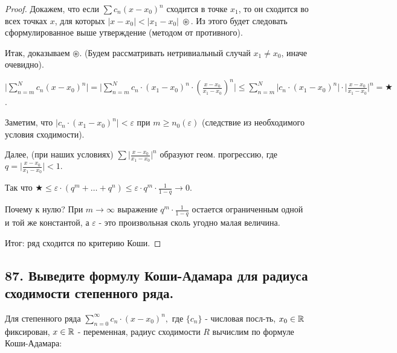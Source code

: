 \documentclass[a4paper, fleqn]{article}
\begin{document}
        \begin{proof}
        
        Докажем, что если $\displaystyle \sum c_n (x - x_0)^n$ сходится в точке $x_1$, то он сходится во всех точках $x$, для которых $|x - x_0| < |x_1 - x_0| \;  \circledast.$ Из этого будет следовать сформулированное выше утверждение (методом от противного).
        
        Итак, доказываем $\circledast$. (Будем рассматривать нетривиальный случай $x_1 \neq x_0$, иначе очевидно).
        
        $ \Bigg| \displaystyle \sum_{n = m}^{N} c_n (x - x_0)^n \Bigg| =
        \Bigg| \sum_{n = m}^{N} c_n \cdot (x_1 - x_0)^n \cdot \left( \frac{x - x_0}{x_1 - x_0} \right)^n \Bigg| \leq
        \sum_{n = m}^{N}  \big| c_n \cdot (x_1 - x_0)^n \big| \cdot \bigg| \frac{x - x_0}{x_1 - x_0} \bigg|^n = \bigstar$.
        
        Заметим, что $\big| c_n \cdot (x_1 - x_0)^n \big| < \varepsilon $ при $m \geq n_0 (\varepsilon)$ (следствие из необходимого условия сходимости).
        
        Далее, (при наших условиях) $\sum \bigg| \frac{x - x_0}{x_1 - x_0} \bigg|^n$ образуют геом. прогрессию, где $q = \bigg| \frac{x - x_0}{x_1 - x_0} \bigg| < 1.$
        
        Так что $\bigstar \leq \varepsilon \cdot (q^m + \dots + q^n)
        \leq \varepsilon \cdot  q^m \cdot \frac{1}{1 - q} \to 0.$ 
        
        Почему к нулю? При $m \to \infty $ выражение $q^m \cdot \frac{1}{1 - q}$ остается ограниченным одной и той же константой, а $\varepsilon$ - это произвольная сколь угодно малая величина.
        
        Итог: ряд сходится по критерию Коши.
        
        
        \end{proof}
        
    \subsection*{87. Выведите формулу Коши-Адамара для радиуса сходимости степенного ряда.}
    
    Для степенного ряда $\displaystyle \sum_{n = 0}^{\infty} c_n \cdot (x - x_0)^n,$ где $\{ c_n \}$ - числовая посл-ть, $x_0 \in \mathbb{R}$ фиксирован,  $x \in \mathbb{R}$ - переменная, радиус сходимости $R$ вычислим по формуле Коши-Адамара:
    
    
\end{document}
